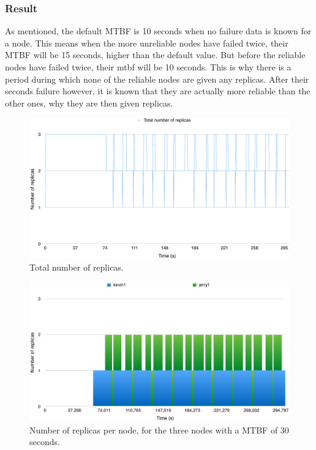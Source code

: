 \documentclass{cslthse-msc}
\begin{document}
\subsubsection*{Result}
As mentioned, the default MTBF is 10 seconds when no failure data is known for a node. This means when the more unreliable nodes have failed twice, their MTBF will be 15 seconds, higher than the default value. But before the reliable nodes have failed twice, their mtbf will be 10 seconds. This is why there is a period during which none of the reliable nodes are given any replicas. After their seconds failure however, it is known that they are actually more reliable than the other ones, why they are then given replicas.

\begin{figure}[!hbt]
\centering
\includegraphics[scale=0.5]{images/results/optimal_replicas/2/total.pdf}
\caption{Total number of replicas.} \label{fig:exp_opt_replicas_total_2}
\end{figure}

\begin{figure}[!hbt]
\centering
\includegraphics[scale=0.5]{images/results/optimal_replicas/2/MTBF_30.pdf}
\caption{Number of replicas per node, for the three nodes with a MTBF of 30 seconds.} \label{fig:exp_opt_replicas_MTBF_30_2}
\end{figure}
\end{document}
